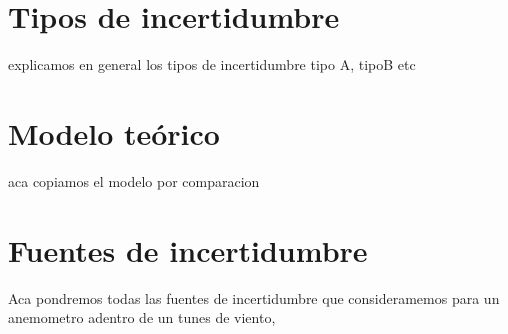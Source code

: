 \section{Tipos de incertidumbre}\label{tipos_incertidumbre}
explicamos en general los tipos de incertidumbre tipo A, tipoB etc
\section{Modelo teórico}\label{modelo_teoricos}
aca copiamos el modelo por comparacion
\section{Fuentes de incertidumbre}\label{modelo_teorico}
Aca pondremos todas las fuentes de incertidumbre que consideramemos para un anemometro adentro de un tunes de viento, 